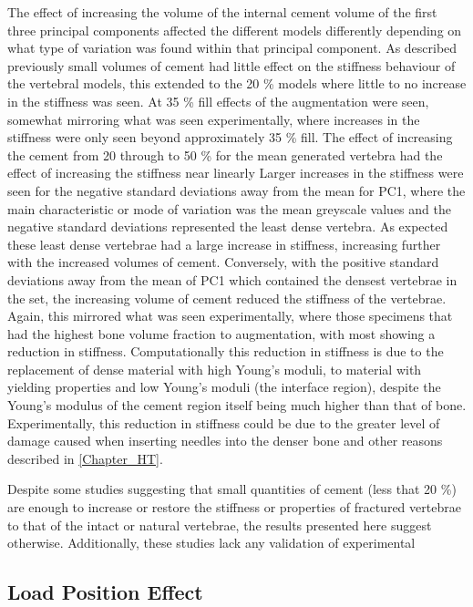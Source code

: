 The effect of increasing the volume of the internal cement volume of the first
three principal components affected the different models differently depending
on what type of variation was found within that principal component.  As
described previously small volumes of cement had little effect on the stiffness
behaviour of the vertebral models, this extended to the 20 \% models where
little to no increase in the stiffness was seen.  At 35 \% fill effects of the
augmentation were seen, somewhat mirroring what was seen experimentally, where
increases in the stiffness were only seen beyond approximately 35 \% fill.  The
effect of increasing the cement from 20 through to 50 \% for the mean generated
vertebra had the effect of increasing the stiffness near linearly %
Larger increases in the stiffness were seen for the negative standard
deviations away from the mean for PC1, where the main characteristic or mode of
variation was the mean greyscale values and the negative standard deviations
represented the least dense vertebra.  As expected these least dense vertebrae
had a large increase in stiffness, increasing further with the increased
volumes of cement.  Conversely, with the positive standard deviations away from
the mean of PC1 which contained the densest vertebrae in the set, the
increasing volume of cement reduced the stiffness of the vertebrae.  Again,
this mirrored what was seen experimentally, where those specimens that had the
highest bone volume fraction %
to augmentation, with most showing a reduction in stiffness.  Computationally
this reduction in stiffness is due to the replacement of dense material with
high Young's moduli, to material with yielding properties and low Young's
moduli (the interface region), despite the Young's modulus of the cement region
itself being much higher than that of bone.  Experimentally, this reduction in
stiffness could be due to the greater level of damage caused when inserting
needles into the denser bone and other reasons described in \cref{Chapter_HT}.

Despite some studies suggesting that small quantities of cement (less that 20
\%) are enough to increase or restore the stiffness or properties of fractured
vertebrae to that of the intact or natural vertebrae, the results presented
here suggest otherwise.  Additionally, these studies lack any validation of
experimental 


\subsection{Load Position Effect}\label{sec:lpe}

